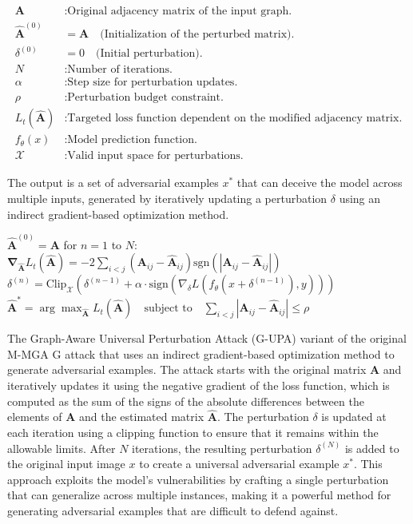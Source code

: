 \[
\begin{aligned}
\mathbf{A} &: \text{Original adjacency matrix of the input graph.} \\
\hat{\mathbf{A}}^{(0)} &= \mathbf{A} \quad \text{(Initialization of the perturbed matrix).} \\
\delta^{(0)} &= 0 \quad \text{(Initial perturbation).} \\
N &: \text{Number of iterations.} \\
\alpha &: \text{Step size for perturbation updates.} \\
\rho &: \text{Perturbation budget constraint.} \\
L_t(\hat{\mathbf{A}}) &: \text{Targeted loss function dependent on the modified adjacency matrix.} \\
f_\theta(x) &: \text{Model prediction function.} \\
\mathcal{X} &: \text{Valid input space for perturbations.}
\end{aligned}
\]

The output is a set of adversarial examples $x^*$ that can deceive the model across multiple inputs, generated by iteratively updating a perturbation $\delta$ using an indirect gradient-based optimization method.

$\hat{\mathbf{A}}^{(0)} = \mathbf{A}$
for $n = 1$ to $N:$ 
$\mathbf{\nabla}_{\hat{\mathbf{A}}} L_t(\hat{\mathbf{A}}) = -2 \sum_{i<j} (\mathbf{A}_{ij} - \hat{\mathbf{A}}_{ij}) \mathrm{sgn}(|\mathbf{A}_{ij} - \hat{\mathbf{A}}_{ij}|)$
$\delta^{(n)} = \text{Clip}_{\mathcal{X}} (\delta^{(n-1)} + \alpha \cdot \text{sign}(\nabla_\delta L(f_\theta(x + \delta^{(n-1)}), y)))$
$\hat{\mathbf{A}}^* = \arg \max_{\hat{\mathbf{A}}} L_t(\hat{\mathbf{A}}) \quad \text{subject to} \quad \sum_{i<j} |\mathbf{A}_{ij} - \hat{\mathbf{A}}_{ij}| \leq \rho$

The Graph-Aware Universal Perturbation Attack (G-UPA) variant of the original M-MGA G attack that uses an indirect gradient-based optimization method to generate adversarial examples. The attack starts with the original matrix $\mathbf{A}$ and iteratively updates it using the negative gradient of the loss function, which is computed as the sum of the signs of the absolute differences between the elements of $\mathbf{A}$ and the estimated matrix $\hat{\mathbf{A}}$. The perturbation $\delta$ is updated at each iteration using a clipping function to ensure that it remains within the allowable limits. After $N$ iterations, the resulting perturbation $\delta^{(N)}$ is added to the original input image $x$ to create a universal adversarial example $x^*$. This approach exploits the model's vulnerabilities by crafting a single perturbation that can generalize across multiple instances, making it a powerful method for generating adversarial examples that are difficult to defend against.